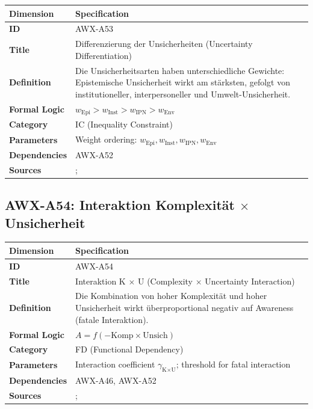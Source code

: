 \begin{table}[htbp]
\small
\begin{tabular}{p{3cm}p{11cm}}
\toprule
\textbf{Dimension} & \textbf{Specification} \\
\midrule
\textbf{ID} & AWX-A53 \\
\textbf{Title} & Differenzierung der Unsicherheiten (Uncertainty Differentiation) \\
\textbf{Definition} & Die Unsicherheitsarten haben unterschiedliche Gewichte: Epistemische Unsicherheit wirkt am stärksten, gefolgt von institutioneller, interpersoneller und Umwelt-Unsicherheit. \\
\textbf{Formal Logic} & $w_{\text{Epi}} > w_{\text{Inst}} > w_{\text{IPN}} > w_{\text{Env}}$ \\
\textbf{Category} & IC (Inequality Constraint) \\
\textbf{Parameters} & Weight ordering: $w_{\text{Epi}}, w_{\text{Inst}}, w_{\text{IPN}}, w_{\text{Env}}$ \\
\textbf{Dependencies} & AWX-A52 \\
\textbf{Sources} & \citet{knight1921risk}; \citet{camerer1992recent} \\
\bottomrule
\end{tabular}
\end{table}


\subsection{AWX-A54: Interaktion Komplexität $\times$ Unsicherheit}

\begin{table}[htbp]
\small
\begin{tabular}{p{3cm}p{11cm}}
\toprule
\textbf{Dimension} & \textbf{Specification} \\
\midrule
\textbf{ID} & AWX-A54 \\
\textbf{Title} & Interaktion K $\times$ U (Complexity $\times$ Uncertainty Interaction) \\
\textbf{Definition} & Die Kombination von hoher Komplexität und hoher Unsicherheit wirkt überproportional negativ auf Awareness (fatale Interaktion). \\
\textbf{Formal Logic} & $A = f(-\text{Komp} \times \text{Unsich})$ \\
\textbf{Category} & FD (Functional Dependency) \\
\textbf{Parameters} & Interaction coefficient $\gamma_{\text{K} \times \text{U}}$; threshold for fatal interaction \\
\textbf{Dependencies} & AWX-A46, AWX-A52 \\
\textbf{Sources} & \citet{simon1955behavioral}; \citet{gigerenzer2002bounded} \\
\bottomrule
\end{tabular}
\end{table}

